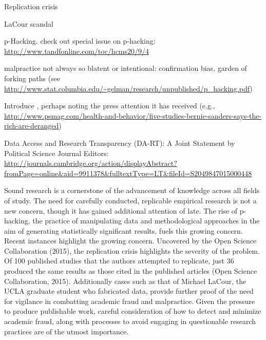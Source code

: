 
Replication crisis

LaCour scandal

p-Hacking.  check out special issue on p-hacking: \url{http://www.tandfonline.com/toc/hcms20/9/4}

malpractice not always so blatent or intentional: confirmation bias, garden of forking paths (see \url{http://www.stat.columbia.edu/~gelman/research/unpublished/p_hacking.pdf})

Introduce \citet{Newman2015}, perhaps noting the press attention it has received (e.g., \url{http://www.psmag.com/health-and-behavior/five-studies-bernie-sanders-says-the-rich-are-deranged})

Data Access and Research Transparency (DA-RT): A Joint Statement by Political Science Journal Editors: \url{http://journals.cambridge.org/action/displayAbstract?fromPage=online&aid=9911378&fulltextType=LT&fileId=S2049847015000448}

Sound research is a cornerstone of the advancement of knowledge across all fields of study. The need for carefully conducted, replicable empirical research is not a new concern, though it has gained additional attention of late. The rise of p-hacking, the practice of manipulating data and methodological approaches in the aim of generating statistically significant results, fuels this growing concern. Recent instances highlight the growing concern. Uncovered by the Open Science Collaboration (2015), the replication crisis highlights the severity of the problem. Of 100 published studies that the authors attempted to replicate, just 36 produced the same results as those cited in the published articles (Open Science Collaboration, 2015). Additionally cases such as that of Michael LaCour, the UCLA graduate student who fabricated data, provide further proof of the need for vigilance in combatting academic fraud and malpractice. Given the pressure to produce publishable work, careful consideration of how to detect and minimize academic fraud, along with processes to avoid engaging in questionable research practices are of the utmost importance.

